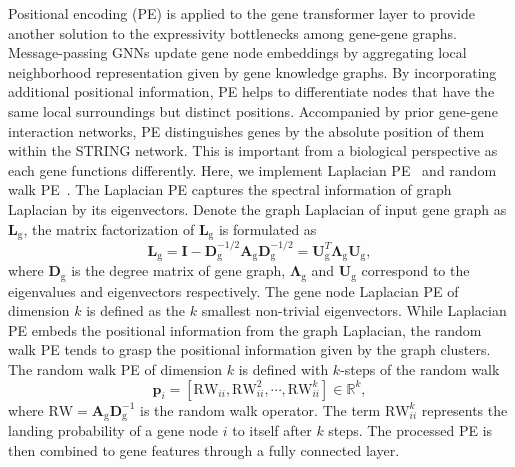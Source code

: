 Positional encoding (PE) is applied to the gene transformer layer to provide another solution to the expressivity bottlenecks among gene-gene graphs. Message-passing GNNs update gene node embeddings by aggregating local neighborhood representation given by gene knowledge graphs. By incorporating additional positional information, PE helps to differentiate nodes that have the same local surroundings but distinct positions. Accompanied by prior gene-gene interaction networks, PE distinguishes genes by the absolute position of them within the STRING network. This is important from a biological perspective as each gene functions differently. Here, we implement Laplacian PE~\cite{dwivedi2020generalization} and random walk PE~\cite{dwivedi2022graph}. The Laplacian PE captures the spectral information of graph Laplacian by its eigenvectors. Denote the graph Laplacian of input gene graph as $\mathbf{L}_{\text{g}}$, the matrix factorization of $\mathbf{L}_{\text{g}}$ is formulated as
\begin{equation}
    \mathbf{L}_{\text{g}}=\mathbf{I}-\mathbf{D}_{\text{g}}^{-1 / 2} \mathbf{A}_{\text{g}} \mathbf{D}_{\text{g}}^{-1 / 2}=\mathbf{U}_{\text{g}}^{T} \mathbf{\Lambda}_{\text{g}} \mathbf{U}_{\text{g}},
\end{equation}
where $\mathbf{D}_{\text{g}}$ is the degree matrix of gene graph, $\mathbf{\Lambda}_{\text{g}}$ and $\mathbf{U}_{\text{g}}$ correspond to the eigenvalues and eigenvectors respectively. The gene node Laplacian PE of dimension $k$ is defined as the $k$ smallest non-trivial eigenvectors. While Laplacian PE embeds the positional information from the graph Laplacian, the random walk PE tends to grasp the positional information given by the graph clusters. The random walk PE of dimension $k$ is defined with $k$-steps of the random walk
\begin{equation}
    \mathbf{p}_{i}=\left[\mathrm{RW}_{i i}, \mathrm{RW}_{i i}^{2}, \cdots, \mathrm{RW}_{i i}^{k}\right] \in \mathbb{R}^{k},
\end{equation}
where $\mathrm{RW}=\mathbf{A}_{\text{g}} \mathbf{D}_{\text{g}}^{-1}$ is the random walk operator. The term $\mathrm{RW}_{i i}^k$ represents the landing probability of a gene node $i$ to itself after $k$ steps. The processed PE is then combined to gene features through a fully connected layer.


